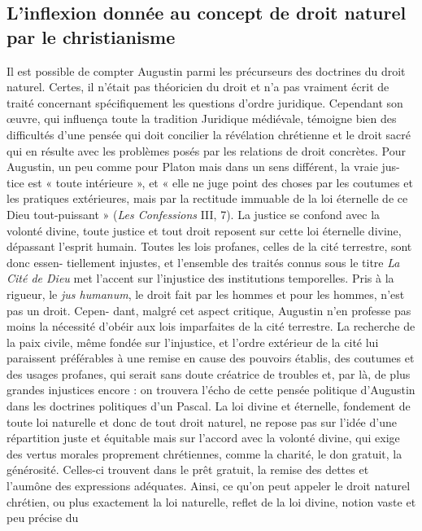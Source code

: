 \subsection{L’inflexion donnée au concept
de droit naturel par le christianisme}

Il est possible de compter Augustin
parmi les précurseurs des doctrines du
droit naturel. Certes, il n’était pas théoricien du droit et n’a pas vraiment écrit de
traité concernant spécifiquement les questions d'ordre juridique. Cependant son
œuvre, qui influença toute la tradition
Juridique médiévale, témoigne bien des
difficultés d’une pensée qui doit concilier
%
la révélation chrétienne et le droit sacré
qui en résulte avec les problèmes posés
par les relations de droit concrètes. Pour
Augustin, un peu comme pour Platon
mais dans un sens différent, la vraie jus-
tice est « toute intérieure », et « elle ne
juge point des choses par les coutumes et
les pratiques extérieures, mais par la rectitude immuable de la loi éternelle de ce
Dieu tout-puissant » ({\it Les Confessions} III,
7). La justice se confond avec la volonté
divine, toute justice et tout droit reposent
sur cette loi éternelle divine, dépassant
l’esprit humain. Toutes les lois profanes,
celles de la cité terrestre, sont donc essen-
tiellement injustes, et l’ensemble des
traités connus sous le titre {\it La Cité de Dieu}
met l’accent sur l'injustice des institutions
temporelles. Pris à la rigueur, le {\it jus humanum}, le droit fait par les hommes et pour
les hommes, n’est pas un droit. Cepen-
dant, malgré cet aspect critique, Augustin
n’en professe pas moins la nécessité
d’obéir aux lois imparfaites de la cité terrestre. La recherche de la paix civile,
même fondée sur l'injustice, et l’ordre
extérieur de la cité lui paraissent préférables à une remise en cause des pouvoirs
établis, des coutumes et des usages profanes, qui serait sans doute créatrice de
troubles et, par là, de plus grandes injustices encore : on trouvera l’écho de cette
pensée politique d’Augustin dans les doctrines politiques d’un Pascal. La loi divine
et éternelle, fondement de toute loi naturelle et donc de tout droit naturel, ne
repose pas sur l’idée d’une répartition
juste et équitable mais sur l’accord avec
la volonté divine, qui exige des vertus
morales proprement chrétiennes, comme
la charité, le don gratuit, la générosité.
Celles-ci trouvent dans le prêt gratuit, la
remise des dettes et l’aumône des expressions adéquates. Ainsi, ce qu'on peut
appeler le droit naturel chrétien, ou plus
exactement la loi naturelle, reflet de la loi
divine, notion vaste et peu précise du
